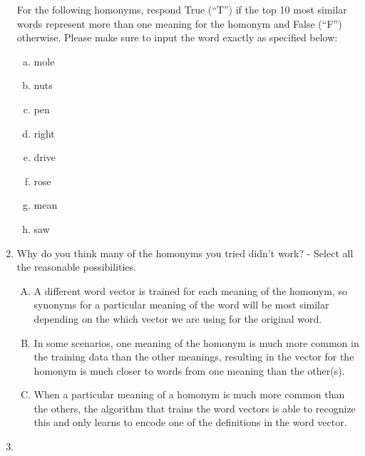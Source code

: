 \begin{enumerate}[1.]
For the following homonyms, respond True (``T'') if the top 10 most similar words represent more than one meaning for the homonym and False (``F'') otherwise. Please make sure to input the word exactly as specified below:

\begin{enumerate}[a.]
\item mole
\item nuts
\item pen
\item right
\item drive
\item rose
\item mean
\item saw
\end{enumerate}


\item {}

Why do you think many of the homonyms you tried didn't work? - Select all the reasonable possibilities.

\begin{enumerate}[A)]
\item A different word vector is trained for each meaning of the homonym, so synonyms for a particular meaning of the word will be most similar depending on the which vector we are using for the original word.

\item In some scenarios, one meaning of the homonym is much more common in the training data than the other meanings, resulting in the vector for the homonym is much closer to words from one meaning than the other(s).

\item When a particular meaning of a homonym is much more common than the others, the algorithm that trains the word vectors is able to recognize this and only learns to encode one of the definitions in the word vector.
\end{enumerate}


\item {}


\end{enumerate}
